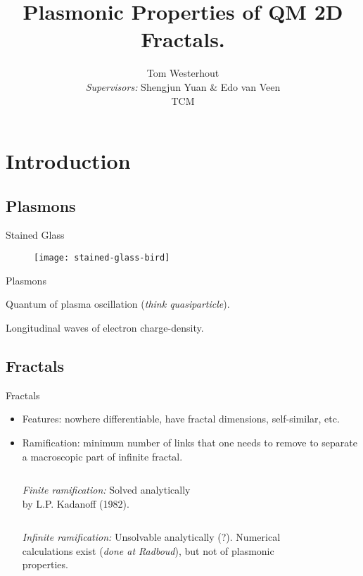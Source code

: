 \documentclass{beamer}
\title{Plasmonic Properties of QM 2D Fractals.}
\author{Tom Westerhout \\ 
        \emph{Supervisors:} Shengjun Yuan \& Edo van Veen \\
        TCM}
\date{}
\begin{document}
\begin{frame}
    \titlepage
\end{frame}

\section{Introduction}

\subsection{Plasmons}

\begin{frame}{Stained Glass}
    \begin{figure}
    \texttt{[image: stained-glass-bird]}
    \end{figure}
\end{frame}

\begin{frame}{Plasmons}
    \begin{definition}[Plasmon]
        Quantum of plasma oscillation (\emph{think quasiparticle}).
    \end{definition}

    \begin{definition}
        Longitudinal waves of electron charge-density.
    \end{definition}
\end{frame}

\subsection{Fractals}

\begin{frame}{Fractals}
    \begin{itemize}
    \item Features: nowhere differentiable, have fractal dimensions, self-similar, etc.
    \item Ramification: minimum number of links that one needs to remove to separate a macroscopic part of infinite fractal.
        \begin{columns}[T]
            \emph{Finite ramification:} \alert{Solved analytically} \\ by L.P. Kadanoff (1982).
            \begin{figure}
            
            \end{figure}
        \end{columns}

        \begin{columns}[T]
            \emph{Infinite ramification:} \alert{Unsolvable analytically} (?). Numerical calculations exist (\emph{done at Radboud}), but not of plasmonic properties.
            \begin{figure}
            
            \end{figure}
        \end{columns}
    \end{itemize}
\end{frame}
\end{document}
